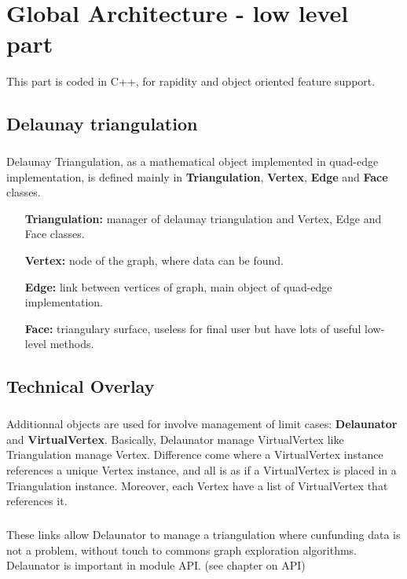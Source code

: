 \documentclass{report}
\begin{document}
\chapter{Global Architecture - low level part}
This part is coded in C++, for rapidity and object oriented feature support.

\section{Delaunay triangulation}
    \paragraph*{}
    Delaunay Triangulation, as a mathematical object implemented in quad-edge implementation, is defined mainly in \textbf{Triangulation}, \textbf{Vertex}, \textbf{Edge} and \textbf{Face} classes.
    \begin{itemize}
        \item[\textbf{Triangulation:}] manager of delaunay triangulation and Vertex, Edge and Face classes.
        \item[\textbf{Vertex:}] node of the graph, where data can be found.
        \item[\textbf{Edge:}] link between vertices of graph, main object of quad-edge implementation.
        \item[\textbf{Face:}] triangulary surface, useless for final user but have lots of useful low-level methods.
    \end{itemize}



\section{Technical Overlay}
    \paragraph*{}
    Additionnal objects are used for involve management of limit cases: \textbf{Delaunator} and \textbf{VirtualVertex}.
    Basically, Delaunator manage VirtualVertex like Triangulation manage Vertex. Difference come where a VirtualVertex instance references a unique Vertex instance, and all is as if a VirtualVertex is placed in a Triangulation
    instance. Moreover, each Vertex have a list of VirtualVertex that references it. 
    \paragraph*{}
    These links allow Delaunator to manage a triangulation where cunfunding data is not a problem, without touch to commons graph exploration algorithms.
    Delaunator is important in module API. (see chapter on API)
\end{document}
